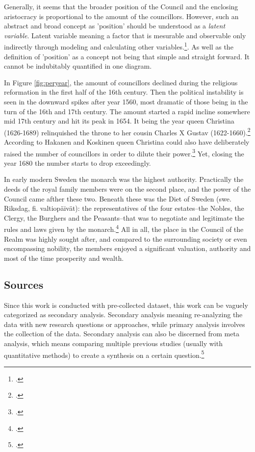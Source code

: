 Generally, it seems that the broader position of the Council and the enclosing aristocracy is proportional to the amount of the councillors. However, such an abstract and broad concept as 'position' should be understood as a \textit{latent variable}. Latent variable meaning a factor that is mesurable and observable only indirectly through modeling and calculating other variables.\footcite{apa}. As well as the definition of 'position' as a concept not being that simple and straight forward. It cannot be indubitably quantified in one diagram.

In Figure \ref{fig:peryear}, the amount of councillors declined during the religious reformation in the first half of the 16th century. Then the political instability is seen in the downward spikes after year 1560, most dramatic of those being in the turn of the 16th and 17th century. The amount started a rapid incline somewhere mid 17th century and hit its peak in 1654. It being the year queen Christina (1626-1689) relinquished the throne to her cousin Charles X Gustav (1622-1660).\footcite[p. 8-9.]{personalAgency} According to Hakanen and Koskinen queen Christina could also have deliberately raised the number of councillors in order to dilute their power.\footcite[p. 63-64.]{HakanenAKoskinen2017} Yet, closing the year 1680 the number starts to drop exceedingly.

In early modern Sweden the monarch was the highest authority. Practically the deeds of the royal family members were on the second place, and the power of the Council came afther these two. Beneath these was the Diet of Sweden (swe. Riksdag, fi. valtiopäivät): the representatives of the four estates–the Nobles, the Clergy, the Burghers and the Peasants–that was to negotiate and legitimate the rules and laws given by the monarch.\footcite[p. 57-61.]{pSuurvalta}  All in all, the place in the Council of the Realm was highly sought after, and compared to the surrounding society or even encompassing nobility, the members enjoyed a significant valuation, authority and most of the time prosperity and wealth.

\subsection{Sources}
\label{sources}
Since this work is conducted with pre-collected dataset, this work can be vaguely categorized as secondary analysis. Secondary analysis meaning re-analyzing the data with new research questions or approaches, while primary analysis involves the collection of the data. Secondary analysis can also be discerned from meta analysis, which means comparing multiple previous studies (usually with quantitative methods) to create a synthesis on a certain question.\footcite[p. 4-5.]{meta-analysis} 

